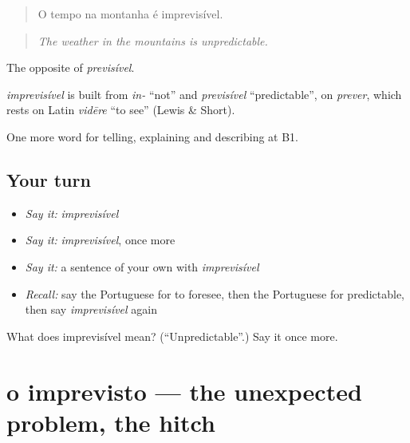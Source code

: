 \begin{quote}
O tempo na montanha é imprevisível.
\end{quote}

\begin{quote}
\emph{The weather in the mountains is unpredictable.}
\end{quote}

The opposite of \emph{previsível}.

\begin{cousinweb}
\emph{imprevisível} is built from \emph{in-} \textquotedblleft{}not\textquotedblright{} and \emph{previsível} \textquotedblleft{}predictable\textquotedblright{}, on \emph{prever}, which rests on Latin \emph{vidēre} \textquotedblleft{}to see\textquotedblright{} (Lewis \& Short).
\end{cousinweb}

\begin{grammarlens}[title={What you've built}]
One more word for telling, explaining and describing at B1.
\end{grammarlens}

\subsection*{Your turn}
\begin{itemize}
\raggedright
  \item \emph{Say it:} \emph{imprevisível}
  \item \emph{Say it:} \emph{imprevisível}, once more
  \item \emph{Say it:} a sentence of your own with \emph{imprevisível}
  \item \emph{Recall:} say the Portuguese for to foresee, then the Portuguese for predictable, then say \emph{imprevisível} again
\end{itemize}

\begin{tcolorbox}[breakable,colback=teal!4,colframe=teal!35!black,title={Before you move on}]
What does imprevisível mean? (\textquotedblleft{}Unpredictable\textquotedblright{}.) Say it once more.
\end{tcolorbox}
\section[o imprevisto]{o imprevisto — the unexpected problem, the hitch}

\label{lesson:PT-C371-imprevisto}



